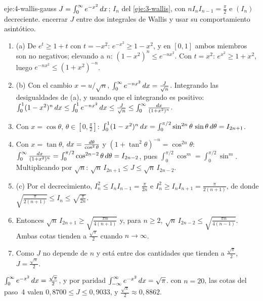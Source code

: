 \begin{solucion}{eje:4-wallis-gauss}
\datos $J=\int_0^{\infty}e^{-x^{2}}\mathop{}\!d x$; $I_n$ del \cref{eje:3-wallis}, con $nI_nI_{n-1}=\frac\pi2$ e $(I_n)$ decreciente.
\planteamiento encerrar $J$ entre dos integrales de Wallis y usar su comportamiento asintótico.
\pasos
\begin{enumerate}[label=\arabic*.]
  \item (a) De $e^{t}\ge1+t$ con $t=-x^{2}$: $e^{-x^{2}}\ge1-x^{2}$, y en $[0,1]$ ambos miembros son no negativos; elevando a $n$: $(1-x^{2})^{n}\le e^{-nx^{2}}$. Con $t=x^{2}$: $e^{x^{2}}\ge1+x^{2}$, luego $e^{-nx^{2}}\le(1+x^{2})^{-n}$.
  \item (b) Con el cambio $x=u/\sqrt n$, $\int_0^{\infty}e^{-nx^{2}}\mathop{}\!d x=\frac{J}{\sqrt n}$. Integrando las desigualdades de (a), y usando que el integrando es positivo:
  $\int_0^{1}(1-x^{2})^{n}\mathop{}\!d x\le\int_0^{1}e^{-nx^{2}}\mathop{}\!d x\le\frac{J}{\sqrt n}\le\int_0^{\infty}\frac{\mathop{}\!d x}{(1+x^{2})^{n}}$.
  \item Con $x=\cos\theta$, $\theta\in[0,\frac\pi2]$: $\int_0^{1}(1-x^{2})^{n}\mathop{}\!d x=\int_0^{\pi/2}\sin^{2n}\theta\,\sin\theta\mathop{}\!d\theta=I_{2n+1}$.
  \item Con $x=\tan\theta$, $\mathop{}\!d x=\frac{\mathop{}\!d\theta}{\cos^{2}\theta}$ y $(1+\tan^{2}\theta)^{-n}=\cos^{2n}\theta$: $\int_0^{\infty}\frac{\mathop{}\!d x}{(1+x^{2})^{n}}=\int_0^{\pi/2}\cos^{2n-2}\theta\mathop{}\!d\theta=I_{2n-2}$, pues $\int_0^{\pi/2}\cos^{m}=\int_0^{\pi/2}\sin^{m}$. Multiplicando por $\sqrt n$: $\sqrt n\,I_{2n+1}\le J\le\sqrt n\,I_{2n-2}$.
  \item (c) Por el decrecimiento, $I_n^{2}\le I_nI_{n-1}=\frac{\pi}{2n}$ e $I_n^{2}\ge I_nI_{n+1}=\frac{\pi}{2(n+1)}$, de donde $\sqrt{\frac{\pi}{2(n+1)}}\le I_n\le\sqrt{\frac{\pi}{2n}}$.
  \item Entonces $\sqrt n\,I_{2n+1}\ge\sqrt{\frac{\pi n}{4(n+1)}}$ y, para $n\ge2$, $\sqrt n\,I_{2n-2}\le\sqrt{\frac{\pi n}{4(n-1)}}$. Ambas cotas tienden a $\frac{\sqrt\pi}{2}$ cuando $n\to\infty$.
  \item Como $J$ no depende de $n$ y está entre dos cantidades que tienden a $\frac{\sqrt\pi}{2}$, $J=\frac{\sqrt\pi}{2}$.
\end{enumerate}
\resultado $\int_0^{\infty}e^{-x^{2}}\mathop{}\!d x=\frac{\sqrt\pi}{2}$, y por paridad $\int_{-\infty}^{\infty}e^{-x^{2}}\mathop{}\!d x=\sqrt\pi$.
\comprobacion con $n=20$, las cotas del paso~4 valen $0{,}8700\le J\le0{,}9033$, y $\frac{\sqrt\pi}{2}\approx0{,}8862$.
\end{solucion}

